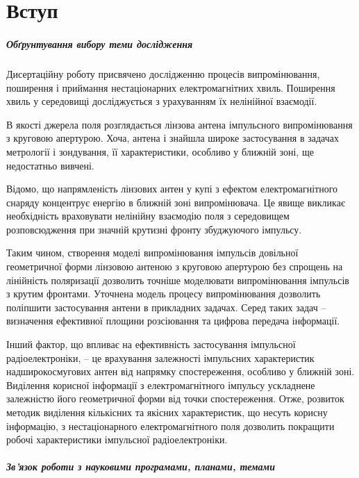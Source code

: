 \chapter*{Вступ}

\paragraph{Обґрунтування вибору теми дослідження}

Дисертаційну роботу присвячено дослідженню процесів випромінювання, поширення 
і приймання нестаціонарних електромагнітних хвиль. Поширення хвиль у 
середовищі досліджується з урахуванням їх нелінійної взаємодії. 

В якості джерела поля розглядається лінзова антена імпульсного випромінювання 
з круговою апертурою. Хоча, антена і знайшла широке застосування в задачах 
метрології і зондування, її характеристики, особливо у ближній зоні, 
ще недостатньо вивчені.

Відомо, що напрямленість лінзових антен у купі з ефектом електромагнітного 
снаряду концентрує енергію в ближній зоні випромінювача. Це явище викликає 
необхідність враховувати нелінійну взаємодію поля з середовищем розповсюдження
при значній крутизні фронту збуджуючого імпульсу.

Таким чином, створення моделі випромінювання імпульсів довільної геометричної 
форми лінзовою антеною з круговою апертурою без спрощень на лінійність 
поляризації дозволить точніше моделювати випромінювання імпульсів з 
крутим фронтами. Уточнена модель процесу випромінювання дозволить поліпшити 
застосування антени в прикладних задачах. Серед таких задач -- визначення 
ефективної площини розсіювання та цифрова передача інформації.

Інший фактор, що впливає на ефективність застосування імпульсної 
радіоелектроніки, -- це врахування залежності імпульсних характеристик 
надширокосмугових антен від напрямку спостереження, особливо у ближній зоні. 
Виділення корисної інформації з електромагнітного імпульсу ускладнене 
залежністю його геометричної форми від точки спостереження. Отже, 
розвиток методик виділення кількісних та якісних характеристик, що несуть 
корисну інформацію, з нестаціонарного електромагнітного поля дозволить 
покращити робочі характеристики імпульсної радіоелектроніки.

\paragraph{Зв'язок роботи з науковими програмами, планами, темами}

